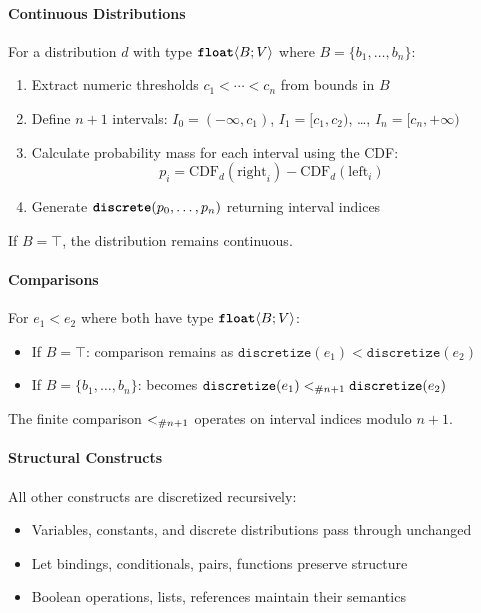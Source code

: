 \paragraph{Continuous Distributions} For a distribution $d$ with type $\text{\ttfamily\bfseries float}\langle B; V \rangle$ where $B = \{b_1, \ldots, b_n\}$:
\begin{enumerate}
    \item Extract numeric thresholds $c_1 < \cdots < c_n$ from bounds in $B$
    \item Define $n+1$ intervals: $I_0 = (-\infty, c_1)$, $I_1 = [c_1, c_2)$, \ldots, $I_n = [c_n, +\infty)$
    \item Calculate probability mass for each interval using the CDF:
    \[ p_i = \text{CDF}_d(\text{right}_i) - \text{CDF}_d(\text{left}_i) \]
    \item Generate $\text{\ttfamily\bfseries discrete}(p_0, \ldots, p_n)$ returning interval indices
\end{enumerate}

If $B = \top$, the distribution remains continuous.

\paragraph{Comparisons} For $e_1 < e_2$ where both have type $\text{\ttfamily\bfseries float}\langle B; V \rangle$:
\begin{itemize}
    \item If $B = \top$: comparison remains as $\texttt{discretize}(e_1) < \texttt{discretize}(e_2)$
    \item If $B = \{b_1, \ldots, b_n\}$: becomes $\texttt{discretize}(e_1) <_{\#{n+1}} \texttt{discretize}(e_2)$
\end{itemize}

The finite comparison $<_{\#{n+1}}$ operates on interval indices modulo $n+1$.

\paragraph{Structural Constructs} All other constructs are discretized recursively:
\begin{itemize}
    \item Variables, constants, and discrete distributions pass through unchanged
    \item Let bindings, conditionals, pairs, functions preserve structure
    \item Boolean operations, lists, references maintain their semantics
\end{itemize}

